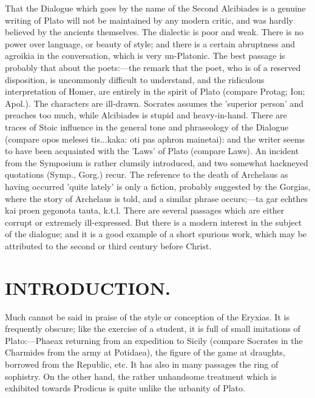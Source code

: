 \documentclass[11pt,letter]{article}
\begin{document}
\par  That the Dialogue which goes by the name of the Second Alcibiades is a genuine writing of Plato will not be maintained by any modern critic, and was hardly believed by the ancients themselves. The dialectic is poor and weak. There is no power over language, or beauty of style; and there is a certain abruptness and agroikia in the conversation, which is very un-Platonic. The best passage is probably that about the poets:—the remark that the poet, who is of a reserved disposition, is uncommonly difficult to understand, and the ridiculous interpretation of Homer, are entirely in the spirit of Plato (compare Protag; Ion; Apol.). The characters are ill-drawn. Socrates assumes the 'superior person' and preaches too much, while Alcibiades is stupid and heavy-in-hand. There are traces of Stoic influence in the general tone and phraseology of the Dialogue (compare opos melesei tis...kaka: oti pas aphron mainetai): and the writer seems to have been acquainted with the 'Laws' of Plato (compare Laws). An incident from the Symposium is rather clumsily introduced, and two somewhat hackneyed quotations (Symp., Gorg.) recur. The reference to the death of Archelaus as having occurred 'quite lately' is only a fiction, probably suggested by the Gorgias, where the story of Archelaus is told, and a similar phrase occurs;—ta gar echthes kai proen gegonota tauta, k.t.l. There are several passages which are either corrupt or extremely ill-expressed. But there is a modern interest in the subject of the dialogue; and it is a good example of a short spurious work, which may be attributed to the second or third century before Christ.

\par 
\section{
      INTRODUCTION.
    }
\par  Much cannot be said in praise of the style or conception of the Eryxias. It is frequently obscure; like the exercise of a student, it is full of small imitations of Plato:—Phaeax returning from an expedition to Sicily (compare Socrates in the Charmides from the army at Potidaea), the figure of the game at draughts, borrowed from the Republic, etc. It has also in many passages the ring of sophistry. On the other hand, the rather unhandsome treatment which is exhibited towards Prodicus is quite unlike the urbanity of Plato.
\end{document}
